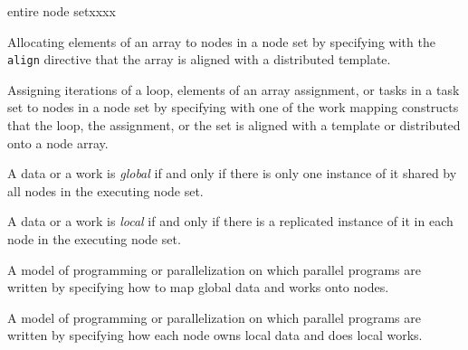 \begin{namelist}{entire node setxxxx}


      Allocating elements of an array to nodes in a node set by
      specifying with the {\tt align} directive that the array is
      aligned with a distributed template.



      Assigning iterations of a loop, elements of an array assignment,
      or tasks in a task set to nodes in a node set by specifying with
      one of the work mapping constructs that the loop, the assignment,
      or the set is aligned with a template or distributed onto a node
      array.

%


      A data or a work is {\it global} if and only if there is only one
      instance of it shared by all nodes in the executing node set.


      A data or a work is {\it local} if and only if there is a
      replicated instance of it in each node in the executing node set.


      A model of programming or parallelization on which parallel
      programs are written by specifying how to map global data and
      works onto nodes.


      A model of programming or parallelization on which parallel
      programs are written by specifying how each node owns local
      data and does local works.


%

\end{namelist}



